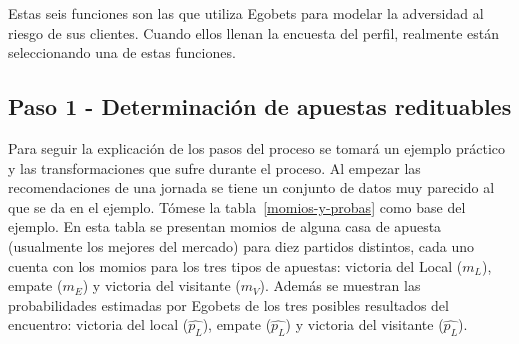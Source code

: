 Estas seis funciones son las que utiliza Egobets para modelar la adversidad al riesgo de sus clientes. Cuando ellos llenan la encuesta del perfil, realmente están seleccionando una de estas funciones.


\subsection{Paso 1 - Determinación de apuestas redituables}
\label{sec:paso-1}


Para seguir la explicación de los pasos del proceso se tomará un ejemplo práctico y las transformaciones que sufre durante el proceso. Al empezar las recomendaciones de una jornada se tiene un conjunto de datos muy parecido al que se da en el ejemplo. Tómese la tabla~\ref{momios-y-probas} como base del ejemplo. En esta tabla se presentan momios de alguna casa de apuesta (usualmente los mejores del mercado) para diez partidos distintos, cada uno cuenta con los momios para los tres tipos de apuestas: victoria del Local ($m_L$), empate ($m_E$) y victoria del visitante ($m_V$). Además se muestran las probabilidades estimadas por Egobets de los tres posibles resultados del encuentro: victoria del local ($\hat{p_L}$), empate ($\hat{p_L}$) y victoria del visitante ($\hat{p_L}$).

\begin{table}[ht]
\centering
{}
\caption{Diez partidos con sus respectivos momios y las probabilidades estimadas por Egobets}
\label{momios-y-probas}
\end{table}

